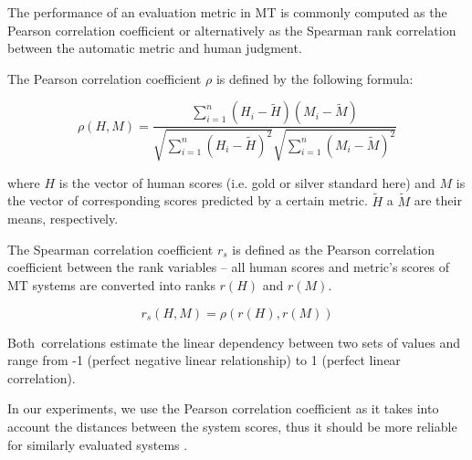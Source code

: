 The performance of an evaluation metric in MT is commonly computed as the
Pearson correlation coefficient or alternatively as the Spearman rank 
correlation between the automatic metric and human judgment. 

The Pearson correlation coefficient $\rho$ is defined by the following formula:

\begin{equation*}
\rho(H,M) = \frac{ \sum_{i=1}^{n}{(H_i - \tilde{H})(M_i - \tilde{M})}}{ \sqrt{ \sum_{i=1}^{n}{(H_i - \tilde{H})^2} }  \sqrt{ \sum_{i=1}^{n}{(M_i - \tilde{M})^2} } } 
\end{equation*}

where $H$ is the vector of human scores (i.e. gold or silver standard here) and 
$M$ is the vector of corresponding scores predicted by a certain metric. 
$\tilde{H}$ a $\tilde{M}$ are their means, respectively. 

The Spearman correlation coefficient $r_{s} $ is defined as the Pearson 
correlation coefficient between the rank variables -- all human scores and  
metric’s scores of MT systems are converted into ranks $r(H)$ and $r(M)$.

\begin{equation*}
r_{s}(H,M) = \rho(r(H),r(M))
\end{equation*}

Both~correlations estimate the linear dependency between two sets of values and 
range from -1 (perfect negative linear relationship) to 1 (perfect linear correlation). 

In our experiments, we use the Pearson correlation coefficient as it takes into 
account the distances between the system scores, thus it should be more 
reliable for similarly evaluated systems \citep{machacek-bojar-2014-results}. 

%
%
%

